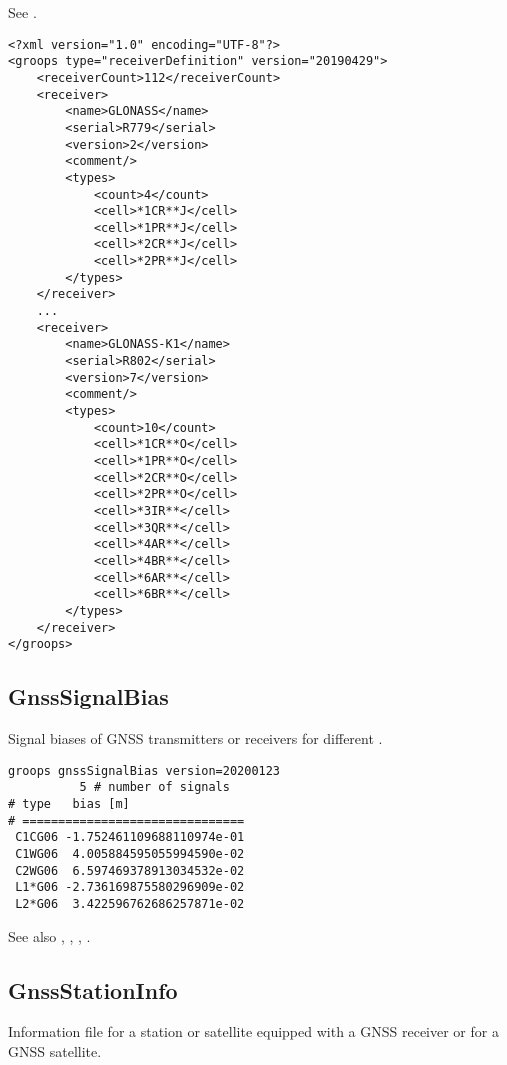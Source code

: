 See .

\begin{verbatim}
<?xml version="1.0" encoding="UTF-8"?>
<groops type="receiverDefinition" version="20190429">
    <receiverCount>112</receiverCount>
    <receiver>
        <name>GLONASS</name>
        <serial>R779</serial>
        <version>2</version>
        <comment/>
        <types>
            <count>4</count>
            <cell>*1CR**J</cell>
            <cell>*1PR**J</cell>
            <cell>*2CR**J</cell>
            <cell>*2PR**J</cell>
        </types>
    </receiver>
    ...
    <receiver>
        <name>GLONASS-K1</name>
        <serial>R802</serial>
        <version>7</version>
        <comment/>
        <types>
            <count>10</count>
            <cell>*1CR**O</cell>
            <cell>*1PR**O</cell>
            <cell>*2CR**O</cell>
            <cell>*2PR**O</cell>
            <cell>*3IR**</cell>
            <cell>*3QR**</cell>
            <cell>*4AR**</cell>
            <cell>*4BR**</cell>
            <cell>*6AR**</cell>
            <cell>*6BR**</cell>
        </types>
    </receiver>
</groops>
\end{verbatim}


\subsection{GnssSignalBias}\label{general.fileFormat:gnssSignalBias}
Signal biases of GNSS transmitters or receivers for different .

\begin{verbatim}
groops gnssSignalBias version=20200123
          5 # number of signals
# type   bias [m]
# ===============================
 C1CG06 -1.752461109688110974e-01
 C1WG06  4.005884595055994590e-02
 C2WG06  6.597469378913034532e-02
 L1*G06 -2.736169875580296909e-02
 L2*G06  3.422596762686257871e-02
 \end{verbatim}

See also , , , .


\subsection{GnssStationInfo}\label{general.fileFormat:gnssStationInfo}
Information file for a station or satellite equipped with a GNSS receiver
or for a GNSS satellite.


